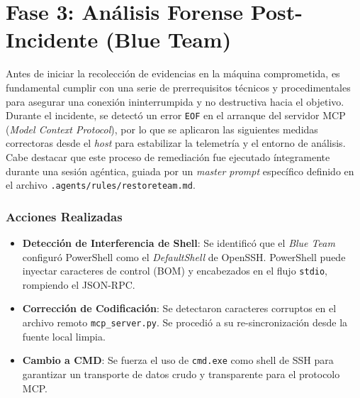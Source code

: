 \chapter[Fase 3: Análisis Forense]{Fase 3: Análisis Forense Post-Incidente (Blue Team)}
\label{chap:fase_3_analisis_forense}

Antes de iniciar la recolección de evidencias en la máquina comprometida, es fundamental cumplir con una serie de prerrequisitos técnicos y procedimentales para asegurar una conexión ininterrumpida y no destructiva hacia el objetivo. Durante el incidente, se detectó un error \texttt{EOF} en el arranque del servidor MCP (\textit{Model Context Protocol}), por lo que se aplicaron las siguientes medidas correctoras desde el \textit{host} para estabilizar la telemetría y el entorno de análisis. Cabe destacar que este proceso de remediación fue ejecutado íntegramente durante una sesión agéntica, guiada por un \textit{master prompt} específico definido en el archivo \texttt{.agents/rules/restoreteam.md}.

\subsection*{Acciones Realizadas}
\begin{itemize}
    \item \textbf{Detección de Interferencia de Shell}: Se identificó que el \textit{Blue Team} configuró PowerShell como el \textit{DefaultShell} de OpenSSH. PowerShell puede inyectar caracteres de control (BOM) y encabezados en el flujo \texttt{stdio}, rompiendo el JSON-RPC.
    \item \textbf{Corrección de Codificación}: Se detectaron caracteres corruptos en el archivo remoto \texttt{mcp\_server.py}. Se procedió a su re-sincronización desde la fuente local limpia.
    \item \textbf{Cambio a CMD}: Se fuerza el uso de \texttt{cmd.exe} como shell de SSH para garantizar un transporte de datos crudo y transparente para el protocolo MCP.
\end{itemize}


